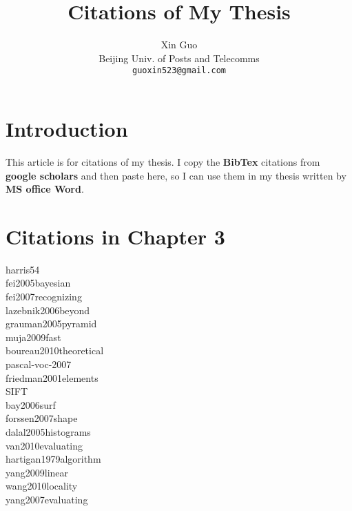 \documentclass[10pt,letterpaper]{article}
\begin{document}
\title{Citations of My Thesis}

\author{Xin Guo\\
Beijing Univ. of Posts and Telecomms\\
{\tt\small guoxin523@gmail.com}
}

\maketitle

\section{Introduction}
This article is for citations of my thesis. I copy the \textbf{BibTex} citations from \textbf{google scholars} and then paste here, so I can use them in my thesis written by \textbf{MS office Word}.

\section{Citations in Chapter 3}
harris54 \cite{harris54} \\
fei2005bayesian \cite{fei2005bayesian} \\
fei2007recognizing \cite{fei2007recognizing} \\
lazebnik2006beyond \cite{lazebnik2006beyond}\\
grauman2005pyramid \cite{grauman2005pyramid} \\
muja2009fast \cite{muja2009fast} \\
boureau2010theoretical \cite{boureau2010theoretical} \\
pascal-voc-2007 \cite{pascal-voc-2007} \\
friedman2001elements \cite{friedman2001elements} \\
SIFT \cite{lowe1999object,lowe2004distinctive} \\
bay2006surf \cite{bay2006surf} \\
forssen2007shape \cite{forssen2007shape} \\
dalal2005histograms \cite{dalal2005histograms} \\
van2010evaluating \cite{van2010evaluating} \\
hartigan1979algorithm \cite{hartigan1979algorithm} \\
yang2009linear \cite{yang2009linear} \\
wang2010locality \cite{wang2010locality} \\
yang2007evaluating \cite{yang2007evaluating} \\


{\small


}
\end{document}
